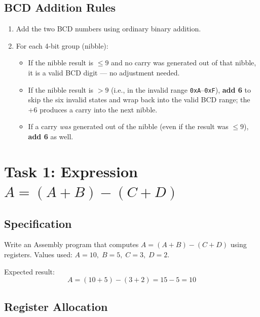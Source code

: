 \documentclass[12pt,a4paper]{article}
\begin{document}
\subsection{BCD Addition Rules}

\begin{enumerate}
  \item Add the two BCD numbers using ordinary binary addition.
  \item For each 4-bit group (nibble):
    \begin{itemize}
      \item If the nibble result is $\leq 9$ and no carry was generated out
            of that nibble, it is a valid BCD digit --- no adjustment needed.
      \item If the nibble result is $> 9$ (i.e., in the invalid range
            \texttt{0xA}--\texttt{0xF}), \textbf{add 6} to skip the six
            invalid states and wrap back into the valid BCD range; the +6
            produces a carry into the next nibble.
      \item If a carry \emph{was} generated out of the nibble (even if the
            result was $\leq 9$), \textbf{add 6} as well.
    \end{itemize}
\end{enumerate}

\newpage

\section{Task 1: Expression $A = (A+B)-(C+D)$}

\subsection{Specification}

Write an Assembly program that computes $A = (A + B) - (C + D)$ using
registers.  Values used: $A = 10,\; B = 5,\; C = 3,\; D = 2$.

Expected result:
\[
  A = (10 + 5) - (3 + 2) = 15 - 5 = 10
\]

\subsection{Register Allocation}
\end{document}

